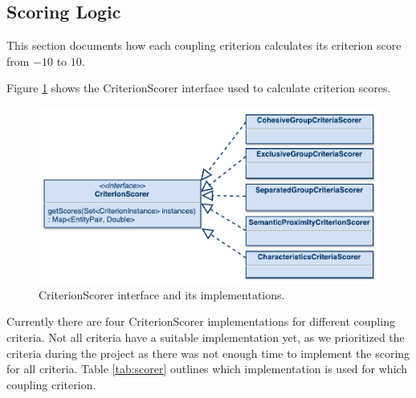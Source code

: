 \subsection{Scoring Logic}

This section documents how each coupling criterion calculates its criterion score from $-10$ to $10$. 

Figure \ref{fig:scorer} shows the CriterionScorer interface used to calculate criterion scores. 

\begin{figure}[H]
	\begin{center}
		\includegraphics[scale=0.7]{diagrams/scorer.pdf}
		\caption{CriterionScorer interface and its implementations.}
		\label{fig:scorer}
	\end{center}
\end{figure}


Currently there are four CriterionScorer implementations for different coupling criteria. Not all criteria have a suitable implementation yet, as we prioritized the criteria during the project as there was not enough time to implement the scoring for all criteria. Table \ref{tab:scorer} outlines which implementation is used for which coupling criterion.

